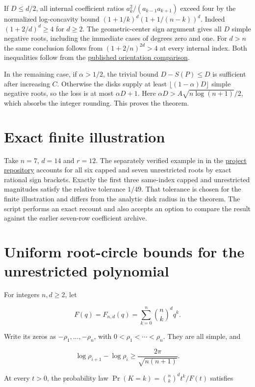 \documentclass[11pt]{article}
\begin{document}
If $D\le d/2$, all internal coefficient ratios $a_k^2/(a_{k-1}a_{k+1})$ exceed four by the normalized log-concavity bound $(1+1/k)^d(1+1/(n-k))^d$. Indeed $(1+2/d)^d\ge4$ for $d\ge2$. The geometric-center sign argument gives all $D$ simple negative roots, including the immediate cases of degrees zero and one. For $d>n$ the same conclusion follows from $(1+2/n)^{2d}>4$ at every internal index. Both inequalities follow from the \href{https://github.com/ProgramComputer/open-math-research/blob/main/topics/balanced-arrays/orientation-normalization.md}{published orientation comparison}.

In the remaining case, if $\alpha>1/2$, the trivial bound $D-S(P)\le D$ is sufficient after increasing $C$. Otherwise the disks supply at least $\lfloor(1-\alpha)D\rfloor$ simple negative roots, so the loss is at most $\alpha D+1$. Here $\alpha D>A\sqrt{n\log(n+1)}/2$, which absorbs the integer rounding. This proves the theorem.

\section{Exact finite illustration}
Take $n=7$, $d=14$ and $r=12$. The separately verified example in
 in the
\href{https://github.com/ProgramComputer/open-math-research}{project repository}
accounts for all six capped and seven unrestricted roots by exact
rational sign brackets. Exactly the first three same-index capped
and unrestricted magnitudes satisfy the relative tolerance $1/49$.
That tolerance is chosen for the finite illustration and differs
from the analytic disk radius in the theorem. The script performs
an exact recount and also accepts an option to compare the result
against the earlier seven-row coefficient archive.

\appendix
\section{Uniform root-circle bounds for the unrestricted polynomial}
\label{app:full}

For integers $n,d\ge2$, let

\[
F(q)=F_{n,d}(q)=\sum_{k=0}^n\binom nk^d q^k.
\]

Write its zeros as $-\rho_1,\ldots,-\rho_n$, with $0<\rho_1<\cdots<\rho_n$. They are all simple, and

\[
\log\rho_{i+1}-\log\rho_i\ge\frac{2\pi}{\sqrt{n(n+1)}}.
\tag{1}
\]

At every $t>0$, the probability law $\Pr(K=k)=\binom nk^d t^k/F(t)$ satisfies
\end{document}
